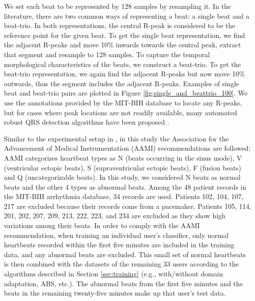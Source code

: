 \documentclass[journal,transmag]{IEEEtran}
\begin{document}
We set each beat to be represented by 128 samples by resampling it. In the literature, there are two common ways of representing a beat: a single beat and a beat-trio. In both representations, the central R-peak is considered to be the reference point for the given beat. To get the single beat representation, we find the adjacent R-peaks and move 10\% inwards towards the central peak, extract that segment and resample to 128 samples. To capture the temporal morphological characteristics of the beats, we construct a beat-trio. To get the beat-trio representation, we again find the adjacent R-peaks but now move 10\% outwards, thus the segment includes the adjacent R-peaks. Examples of single beat and beat-trio pairs are plotted in Figure \ref{fig:single_and_beattrio_100}. We use the annotations provided by the MIT-BIH database to locate any R-peaks, but for cases where peak locations are not readily available, many automated robust QRS detection algorithms have been proposed \cite{pantompkins, li1995detection}.

Similar to the experimental setup in \cite{kiranyaz2017personalized}, in this study the Association for the Advancement of Medical Instrumentation (AAMI) recommendations \cite{AAMI} are followed: AAMI categorizes heartbeat types as N (beats occurring in the sinus mode), V (ventricular ectopic beats), S (supraventricular ectopic beats), F (fusion beats) and Q (uncategorizable beats).  In this study, we considered N beats as normal beats and the other 4 types as abnormal beats. Among the 48 patient records in the MIT-BIH arrhythmia database, 34 records are used. Patients 102, 104, 107, 217 are excluded because their records come from a pacemaker. Patients 105, 114, 201, 202, 207, 209, 213, 222, 223, and 234 are excluded as they show high variations among their beats. In order to comply with the AAMI recommendation, when training an individual user's classifier, only normal heartbeats recorded within the first five minutes are included in the training data, and any abnormal beats are excluded. This small set of normal heartbeats is then combined with the datasets of the remaining 33 users according to the algorithms described in Section \ref{sec:training} (e.g., with/without domain adaptation, ABS, etc.). The abnormal beats from the first five minutes and the beats in the remaining twenty-five minutes make up that user's test data.
\end{document}
